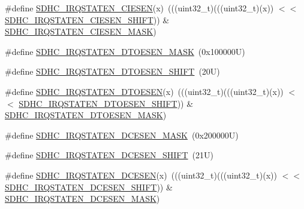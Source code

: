 \begin{DoxyCompactItemize}
\item 
\#define \mbox{\hyperlink{group___s_d_h_c___register___masks_ga5887aa63a8477b50058f1ef59dc8f23b}{S\+D\+H\+C\+\_\+\+I\+R\+Q\+S\+T\+A\+T\+E\+N\+\_\+\+C\+I\+E\+S\+EN}}(x)~(((uint32\+\_\+t)(((uint32\+\_\+t)(x)) $<$$<$ \mbox{\hyperlink{group___s_d_h_c___register___masks_ga5db5c25cea330a48bbd4e8439f6eca8d}{S\+D\+H\+C\+\_\+\+I\+R\+Q\+S\+T\+A\+T\+E\+N\+\_\+\+C\+I\+E\+S\+E\+N\+\_\+\+S\+H\+I\+FT}})) \& \mbox{\hyperlink{group___s_d_h_c___register___masks_gaa59f05865a6f6434fd4fcf216a4d522a}{S\+D\+H\+C\+\_\+\+I\+R\+Q\+S\+T\+A\+T\+E\+N\+\_\+\+C\+I\+E\+S\+E\+N\+\_\+\+M\+A\+SK}})
\item 
\#define \mbox{\hyperlink{group___s_d_h_c___register___masks_ga6e36dd46b6990b4b754e5510d1aa2186}{S\+D\+H\+C\+\_\+\+I\+R\+Q\+S\+T\+A\+T\+E\+N\+\_\+\+D\+T\+O\+E\+S\+E\+N\+\_\+\+M\+A\+SK}}~(0x100000\+U)
\item 
\#define \mbox{\hyperlink{group___s_d_h_c___register___masks_gaaa65471aa5dc9354ffbc0f74257c7445}{S\+D\+H\+C\+\_\+\+I\+R\+Q\+S\+T\+A\+T\+E\+N\+\_\+\+D\+T\+O\+E\+S\+E\+N\+\_\+\+S\+H\+I\+FT}}~(20\+U)
\item 
\#define \mbox{\hyperlink{group___s_d_h_c___register___masks_gae103a579de2fc228925b7178cd90cf69}{S\+D\+H\+C\+\_\+\+I\+R\+Q\+S\+T\+A\+T\+E\+N\+\_\+\+D\+T\+O\+E\+S\+EN}}(x)~(((uint32\+\_\+t)(((uint32\+\_\+t)(x)) $<$$<$ \mbox{\hyperlink{group___s_d_h_c___register___masks_gaaa65471aa5dc9354ffbc0f74257c7445}{S\+D\+H\+C\+\_\+\+I\+R\+Q\+S\+T\+A\+T\+E\+N\+\_\+\+D\+T\+O\+E\+S\+E\+N\+\_\+\+S\+H\+I\+FT}})) \& \mbox{\hyperlink{group___s_d_h_c___register___masks_ga6e36dd46b6990b4b754e5510d1aa2186}{S\+D\+H\+C\+\_\+\+I\+R\+Q\+S\+T\+A\+T\+E\+N\+\_\+\+D\+T\+O\+E\+S\+E\+N\+\_\+\+M\+A\+SK}})
\item 
\#define \mbox{\hyperlink{group___s_d_h_c___register___masks_ga8a3e8003463ce6afcf39fef7e4938377}{S\+D\+H\+C\+\_\+\+I\+R\+Q\+S\+T\+A\+T\+E\+N\+\_\+\+D\+C\+E\+S\+E\+N\+\_\+\+M\+A\+SK}}~(0x200000\+U)
\item 
\#define \mbox{\hyperlink{group___s_d_h_c___register___masks_ga0050daa198388d3a52844f1626e0fd75}{S\+D\+H\+C\+\_\+\+I\+R\+Q\+S\+T\+A\+T\+E\+N\+\_\+\+D\+C\+E\+S\+E\+N\+\_\+\+S\+H\+I\+FT}}~(21\+U)
\item 
\#define \mbox{\hyperlink{group___s_d_h_c___register___masks_ga0e732d562334ff158c67aef5a7b7ff0b}{S\+D\+H\+C\+\_\+\+I\+R\+Q\+S\+T\+A\+T\+E\+N\+\_\+\+D\+C\+E\+S\+EN}}(x)~(((uint32\+\_\+t)(((uint32\+\_\+t)(x)) $<$$<$ \mbox{\hyperlink{group___s_d_h_c___register___masks_ga0050daa198388d3a52844f1626e0fd75}{S\+D\+H\+C\+\_\+\+I\+R\+Q\+S\+T\+A\+T\+E\+N\+\_\+\+D\+C\+E\+S\+E\+N\+\_\+\+S\+H\+I\+FT}})) \& \mbox{\hyperlink{group___s_d_h_c___register___masks_ga8a3e8003463ce6afcf39fef7e4938377}{S\+D\+H\+C\+\_\+\+I\+R\+Q\+S\+T\+A\+T\+E\+N\+\_\+\+D\+C\+E\+S\+E\+N\+\_\+\+M\+A\+SK}})
$$
\end{DoxyCompactItemize}
